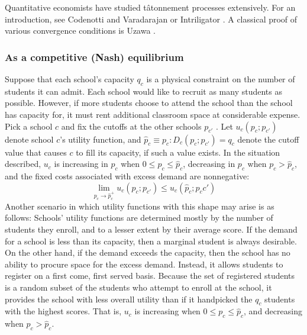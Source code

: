 \documentclass[12pt]{article}
\theoremstyle{definition}
\begin{document}
Quantitative economists have studied t\^{a}tonnement processes extensively. For an introduction, see Codenotti and Varadarajan \parencite*{compmkteq} or Intriligator \parencite*[][chap. 9]{mathematicaloptandecontheory}. A classical proof of various convergence conditions is Uzawa \parencite*{walrastatonnement}. 

\subsubsection{As a competitive (Nash) equilibrium} \label{asacompeq}
Suppose that each school's capacity $q_c$ is a physical constraint on the number of students it can admit. Each school would like to recruit as many students as possible. However, if more students choose to attend the school than the school has capacity for, it must rent additional classroom space at considerable expense. Pick a school $c$ and fix the cutoffs at the other schools $p_{c'}$ . Let $u_c(p_c; p_{c'})$ denote school $c$'s utility function, and $\hat p_c \equiv p_c: D_c(p_c; p_{c'}) = q_c$ denote the cutoff value that causes $c$ to fill its capacity, if such a value exists. In the situation described, $u_c$ is increasing in $p_c$ when $0 \leq p_c \leq \hat p_c$, decreasing in $p_c$ when $p_c > \hat p_c$, and the fixed costs associated with excess demand are nonnegative: \[\lim_{p_c \to \hat p_c^+} u_c(p_c; p_{c'}) \leq  u_c(\hat p_c; p_c{c'})\]
Another scenario in which utility functions with this shape may arise is as follows: Schools' utility functions are determined mostly by the number of students they enroll, and to a lesser extent by their average score. If the demand for a school is less than its capacity, then a marginal student is always desirable. On the other hand, if the demand exceeds the capacity, then the school has no ability to procure space for the excess demand. Instead, it allows students to register on a first come, first served basis. Because the set of registered students is a random subset of the students who attempt to enroll at the school, it provides the school with less overall utility than if it handpicked the $q_c$ students with the highest scores. That is, $u_c$ is increasing when $0 \leq p_c \leq \hat p_c$, and decreasing when $p_c > \hat p_c$. 
\end{document}
